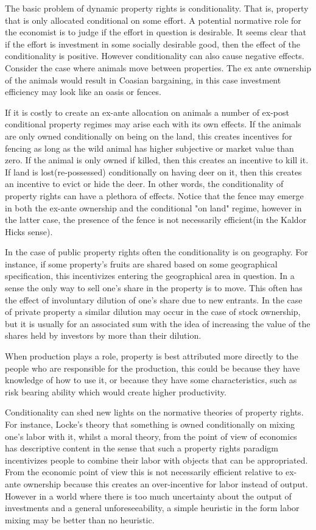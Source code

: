 \documentclass[12pt]{article}
\numberwithin{equation}{section}
\begin{document}
The basic problem of dynamic property rights is conditionality. That is, property that is only allocated conditional on some effort. A potential normative role for the economist is to judge if the effort in question is desirable. It seems clear that if the effort is investment in some socially desirable good, then the effect of the conditionality is positive. However conditionality can also cause negative effects. Consider the case where animals move between properties. The ex ante ownership of the animals would result in Coasian bargaining, in this case investment efficiency may look like an oasis or fences.

If it is costly to create an ex-ante allocation on animals a number of ex-post conditional property regimes may arise each with its own effects. If the animals are only owned conditionally on being on the land, this creates incentives for fencing as long as the wild animal has higher subjective or market value than zero. If the animal is only owned if killed, then this creates an incentive to kill it. If land is lost(re-possessed) conditionally on having deer on it, then this creates an incentive to evict or hide the deer. In other words, the conditionality of property rights can have a plethora of effects. Notice that the fence may emerge in both the ex-ante ownership and the conditional "on land" regime, however in the latter case, the presence of the fence is not necessarily efficient(in the Kaldor Hicks sense).

In the case of public property rights often the conditionality is on geography. For instance, if some property's fruits are shared based on some geographical specification, this incentivizes entering the geographical area in question. In a sense the only way to sell one's share in the property is to move. This often has the effect of involuntary dilution of one's share due to new entrants. In the case of private property a similar dilution may occur in the case of stock ownership, but it is usually for an associated sum with the idea of increasing the value of the shares held by investors by more than their dilution.

When production plays a role, property is best attributed more directly to the people who are responsible for the production, this could be because they have knowledge of how to use it, or because they have some characteristics, such as risk bearing ability which would create higher productivity.

Conditionality can shed new lights on the normative theories of property rights. For instance, Locke's theory that something is owned conditionally on mixing one's labor with it, whilst a moral theory, from the point of view of economics has descriptive content in the sense that such a property rights paradigm incentivizes people to combine their labor with objects that can be appropriated. From the economic point of view this is not necessarily efficient relative to ex-ante ownership because this creates an over-incentive for labor instead of output. However in a world where there is too much uncertainty about the output of investments and a general unforeseeability, a simple heuristic in the form labor mixing may be better than no heuristic.
\end{document}
